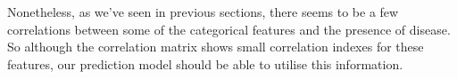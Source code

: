 Nonetheless, as we've seen in previous sections, there seems to be a few correlations between some of the
categorical features and the presence of disease. So although the correlation matrix shows small correlation
indexes for these features, our prediction model should be able to utilise this information.